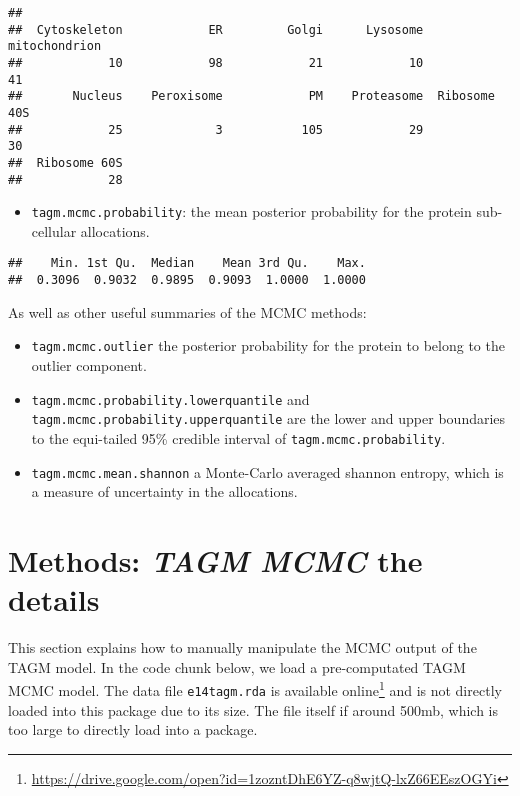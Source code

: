 \documentclass[]{article}
\newenvironment{Shaded}{\begin{snugshade}}{\end{snugshade}}
\newcommand{\KeywordTok}[1]{\textcolor[rgb]{0.13,0.29,0.53}{\textbf{{#1}}}}
\newcommand{\NormalTok}[1]{{#1}}
\providecommand{\tightlist}{%
  \setlength{\itemsep}{0pt}\setlength{\parskip}{0pt}}
\let\rmarkdownfootnote\footnote%
\def\footnote{\protect\rmarkdownfootnote}
\begin{document}
\begin{verbatim}
## 
##  Cytoskeleton            ER         Golgi      Lysosome mitochondrion 
##            10            98            21            10            41 
##       Nucleus    Peroxisome            PM    Proteasome  Ribosome 40S 
##            25             3           105            29            30 
##  Ribosome 60S 
##            28
\end{verbatim}

\begin{itemize}
\tightlist
\item
  \texttt{tagm.mcmc.probability}: the mean posterior probability for the
  protein sub-cellular allocations.
\end{itemize}

\begin{Shaded}
\end{Shaded}

\begin{verbatim}
##    Min. 1st Qu.  Median    Mean 3rd Qu.    Max. 
##  0.3096  0.9032  0.9895  0.9093  1.0000  1.0000
\end{verbatim}

As well as other useful summaries of the MCMC methods:

\begin{itemize}
\item
  \texttt{tagm.mcmc.outlier} the posterior probability for the protein
  to belong to the outlier component.
\item
  \texttt{tagm.mcmc.probability.lowerquantile} and
  \texttt{tagm.mcmc.probability.upperquantile} are the lower and upper
  boundaries to the equi-tailed 95\% credible interval of
  \texttt{tagm.mcmc.probability}.
\item
  \texttt{tagm.mcmc.mean.shannon} a Monte-Carlo averaged shannon
  entropy, which is a measure of uncertainty in the allocations.
\end{itemize}

\section{\texorpdfstring{Methods: \emph{TAGM MCMC} the
details}{Methods: TAGM MCMC the details}}\label{methods-tagm-mcmc-the-details}

This section explains how to manually manipulate the MCMC output of the
TAGM model. In the code chunk below, we load a pre-computated TAGM MCMC
model. The data file \texttt{e14tagm.rda} is available online\footnote{\url{https://drive.google.com/open?id=1zozntDhE6YZ-q8wjtQ-lxZ66EEszOGYi}}
and is not directly loaded into this package due to its size. The file
itself if around 500mb, which is too large to directly load into a
package.
\end{document}
